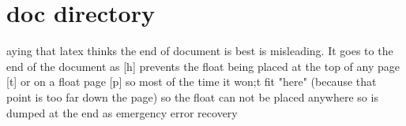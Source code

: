 \section{doc directory}

aying that latex thinks the end of document is best is misleading. It goes to the end of the document as [h] prevents the float being placed at the top of any page [t] or on a float page [p] so most of the time it won;t fit "here" (because that point is too far down the page) so the float can not be placed anywhere so is dumped at the end as emergency error recovery

